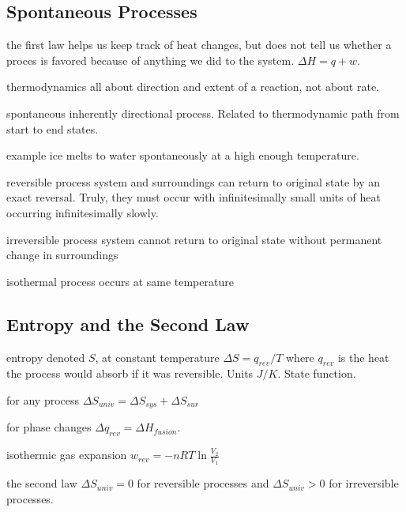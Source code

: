 \begin{mdframed}
\begin{multicols}{2}
\subsection{Spontaneous Processes}
\begin{compactdesc}
    \item[the first law] helps us keep track of heat changes, but does not
        tell us whether a proces is favored because of anything we did to the
        system. $\Delta H = q + w$.
    \item[thermodynamics] all about direction and extent of a reaction, not
        about rate.
    \item[spontaneous] inherently directional process. Related to thermodynamic
        path from start to end states.
    \item[example] ice melts to water spontaneously at a high enough temperature.
    \item[reversible process] system and surroundings can return to original state by
        an exact reversal. Truly, they must occur with infinitesimally small
        units of heat occurring infinitesimally slowly.
    \item[irreversible process] system cannot return to original state without
        permanent change in surroundings
    \item[isothermal] process occurs at same temperature
\end{compactdesc}
\end{multicols}
\end{mdframed}






\begin{mdframed}
\begin{multicols}{2}
\subsection{Entropy and the Second Law}
\begin{compactdesc}
    \item[entropy] denoted $S$, at constant temperature $\Delta S = q_{rev}/T$
        where $q_{rev}$ is the heat the process would absorb if it was
        reversible.
        Units $J/K$. State function.
    \item[for any process] $\Delta S_{univ} = \Delta S_{sys} + \Delta S_{sur}$
    \item[for phase changes] $\Delta q_{rev} = \Delta H_{fusion}$.
    \item[isothermic gas expansion] $w_{rev} = -nRT\ln \frac{V_2}{V_1}$
    \item[the second law] $\Delta S_{univ} = 0$ for reversible processes and
        $\Delta S_{univ} > 0$ for irreversible processes.
\end{compactdesc}
\end{multicols}
\end{mdframed}






